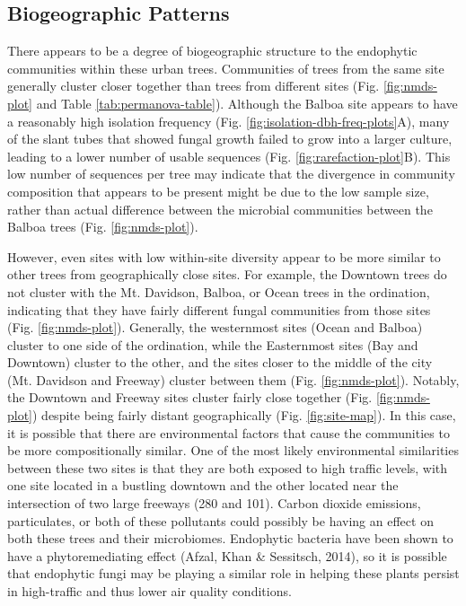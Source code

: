\documentclass[fleqn,10pt,lineno]{wlpeerj} %
\begin{document}
\hypertarget{biogeographic-patterns-1}{%
\subsection*{Biogeographic Patterns}\label{biogeographic-patterns-1}}

There appears to be a degree of biogeographic structure to the endophytic communities within these urban trees. Communities of trees from the same site generally cluster closer together than trees from different sites (Fig. \ref{fig:nmds-plot} and Table \ref{tab:permanova-table}). Although the Balboa site appears to have a reasonably high isolation frequency (Fig. \ref{fig:isolation-dbh-freq-plots}A), many of the slant tubes that showed fungal growth failed to grow into a larger culture, leading to a lower number of usable sequences (Fig. \ref{fig:rarefaction-plot}B). This low number of sequences per tree may indicate that the divergence in community composition that appears to be present might be due to the low sample size, rather than actual difference between the microbial communities between the Balboa trees (Fig. \ref{fig:nmds-plot}).

However, even sites with low within-site diversity appear to be more similar to other trees from geographically close sites. For example, the Downtown trees do not cluster with the Mt. Davidson, Balboa, or Ocean trees in the ordination, indicating that they have fairly different fungal communities from those sites (Fig. \ref{fig:nmds-plot}). Generally, the westernmost sites (Ocean and Balboa) cluster to one side of the ordination, while the Easternmost sites (Bay and Downtown) cluster to the other, and the sites closer to the middle of the city (Mt. Davidson and Freeway) cluster between them (Fig. \ref{fig:nmds-plot}). Notably, the Downtown and Freeway sites cluster fairly close together (Fig. \ref{fig:nmds-plot}) despite being fairly distant geographically (Fig. \ref{fig:site-map}). In this case, it is possible that there are environmental factors that cause the communities to be more compositionally similar. One of the most likely environmental similarities between these two sites is that they are both exposed to high traffic levels, with one site located in a bustling downtown and the other located near the intersection of two large freeways (280 and 101). Carbon dioxide emissions, particulates, or both of these pollutants could possibly be having an effect on both these trees and their microbiomes. Endophytic bacteria have been shown to have a phytoremediating effect (Afzal, Khan \& Sessitsch, 2014), so it is possible that endophytic fungi may be playing a similar role in helping these plants persist in high-traffic and thus lower air quality conditions.
\end{document}
